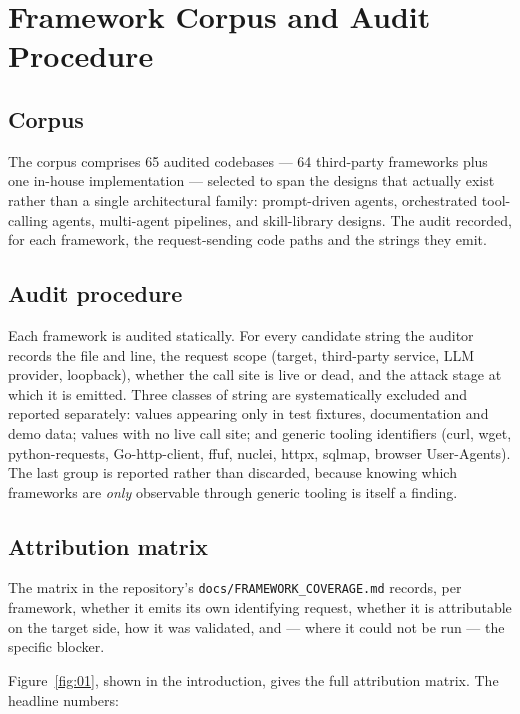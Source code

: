 \documentclass[11pt]{article}
\begin{document}
\section{Framework Corpus and Audit Procedure}
\label{sec:framework}

\subsection{Corpus}
\label{sec:corpus}

The corpus comprises 65 audited codebases --- 64 third-party frameworks plus one in-house
implementation --- selected to span the designs that actually exist rather than a single
architectural family: prompt-driven agents, orchestrated tool-calling agents, multi-agent
pipelines, and skill-library designs. The audit recorded, for each framework, the
request-sending code paths and the strings they emit.

\subsection{Audit procedure}
\label{sec:audit}

Each framework is audited statically. For every candidate string the auditor records the file
and line, the request scope (target, third-party service, LLM provider, loopback), whether the
call site is live or dead, and the attack stage at which it is emitted. Three classes of
string are systematically excluded and reported separately: values appearing only in test
fixtures, documentation and demo data; values with no live call site; and generic tooling
identifiers (curl, wget, python-requests, Go-http-client, ffuf, nuclei, httpx, sqlmap, browser
User-Agents). The last group is reported rather than discarded, because knowing which
frameworks are \emph{only} observable through generic tooling is itself a finding.

\subsection{Attribution matrix}
\label{sec:matrix}

The matrix in the repository's \texttt{docs/FRAMEWORK\_COVERAGE.md} records, per framework,
whether it emits its own identifying request, whether it is attributable on the target side,
how it was validated, and --- where it could not be run --- the specific blocker.

Figure~\ref{fig:01}, shown in the introduction, gives the full attribution matrix.
The headline numbers:
\end{document}
